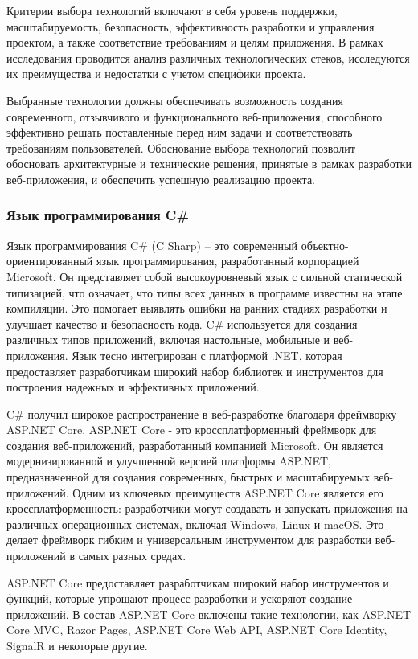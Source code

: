 Критерии выбора технологий включают в себя уровень поддержки, масштабируемость, безопасность, эффективность разработки и управления проектом, а также соответствие требованиям и целям приложения. В рамках исследования проводится анализ различных технологических стеков, исследуются их преимущества и недостатки с учетом специфики проекта.

Выбранные технологии должны обеспечивать возможность создания современного, отзывчивого и функционального веб-приложения, способного эффективно решать поставленные перед ним задачи и соответствовать требованиям пользователей. Обоснование выбора технологий позволит обосновать архитектурные и технические решения, принятые в рамках разработки веб-приложения, и обеспечить успешную реализацию проекта.

\subsubsection{Язык программирования C\#}

Язык программирования C\# (C Sharp) – это современный объектно-ориентированный язык программирования, разработанный корпорацией Microsoft\cite{csdocs}. Он представляет собой высокоуровневый язык с сильной статической типизацией, что означает, что типы всех данных в программе известны на этапе компиляции. Это помогает выявлять ошибки на ранних стадиях разработки и улучшает качество и безопасность кода. C\# используется для создания различных типов приложений, включая настольные, мобильные и веб-приложения. Язык тесно интегрирован с платформой .NET, которая предоставляет разработчикам широкий набор библиотек и инструментов для построения надежных и эффективных приложений.

C\# получил широкое распространение в веб-разработке благодаря фреймворку ASP.NET Core. ASP.NET Core - это кроссплатформенный фреймворк для создания веб-приложений, разработанный компанией Microsoft. Он является модернизированной и улучшенной версией платформы ASP.NET, предназначенной для создания современных, быстрых и масштабируемых веб-приложений. Одним из ключевых преимуществ ASP.NET Core является его кроссплатформенность: разработчики могут создавать и запускать приложения на различных операционных системах, включая Windows, Linux и macOS. Это делает фреймворк гибким и универсальным инструментом для разработки веб-приложений в самых разных средах.

ASP.NET Core предоставляет разработчикам широкий набор инструментов и функций, которые упрощают процесс разработки и ускоряют создание приложений. В состав ASP.NET Core включены такие технологии, как ASP.NET Core MVC, Razor Pages, ASP.NET Core Web API, ASP.NET Core Identity, SignalR и некоторые другие\cite{aspnetdocs}.

